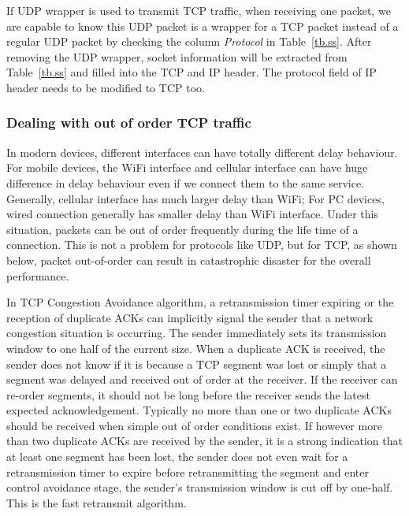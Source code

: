 If UDP wrapper is used to transmit TCP traffic, when receiving one packet, we are capable to know this UDP packet is a wrapper for a TCP packet instead of a regular UDP packet by checking the column \emph{Protocol} in Table~\ref{tb.ss}. After removing the UDP wrapper, socket information will be extracted from Table~\ref{tb.ss} and filled into the TCP and IP header. The protocol field of IP header needs to be modified to TCP too.

%


\subsubsection{Dealing with out of order TCP traffic}

In modern devices, different interfaces can have totally different delay behaviour. For mobile devices, the WiFi interface and cellular interface can have huge difference in delay behaviour even if we connect them to the same service. Generally, cellular interface has much larger delay than WiFi; For PC devices, wired connection generally has smaller delay than WiFi interface. Under this situation, packets can be out of order frequently during the life time of a connection. This is not a problem for protocols like UDP, but for TCP, as shown below, packet out-of-order can result in catastrophic disaster for the overall performance.

In TCP Congestion Avoidance algorithm, a retransmission timer expiring or the reception of duplicate ACKs can implicitly signal the sender that a network congestion situation is occurring. The sender immediately sets its transmission window to one half of the current size. When a duplicate ACK is received, the sender does not know if it is because a TCP segment was lost or simply that a segment was delayed and received out of order at the receiver. If the receiver can re-order segments, it should not be long before the receiver sends the latest expected acknowledgement. Typically no more than one or two duplicate ACKs should be received when simple out of order conditions exist. If however more than two duplicate ACKs are received by the sender, it is a strong indication that at least one segment has been lost, the sender does not even wait for a retransmission timer to expire before retransmitting the segment and enter control avoidance stage, the sender\textquoteright s transmission window is cut off by one-half. This is the fast retransmit algorithm.

